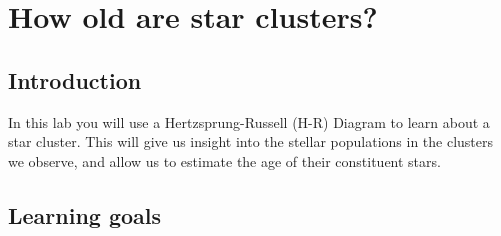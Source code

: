 \chapter{How old are star clusters?}

%
%
%
%
%
%
%
%
%
%


\section{Introduction}

In this lab you will use a Hertzsprung-Russell (H-R) Diagram to learn about a star cluster. This will give us insight into the stellar populations in the clusters we observe, and allow us to estimate the age of their constituent stars. 

\section{Learning goals}

